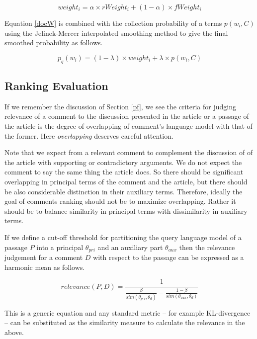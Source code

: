 \documentclass[article]{IEEEtran}
\begin{document}
\begin{equation}
\label{docW}
weight_i = \alpha \times rWeight_i + (1 - \alpha) \times fWeight_i
\end{equation}

Equation \ref{docW} is combined with the collection probability of a terms $p(w_i, C)$ using the Jelinek-Mercer interpolated smoothing method \cite{1371580} to give the final smoothed probability as follows.   

\begin{equation}
\label{wProb}
p_q(w_i) = (1 - \lambda) \times weight_i + \lambda \times p(w_i, C) 
\end{equation}

\subsection{Ranking Evaluation}
If we remember the discussion of Section \ref{pf}, we see the criteria for judging relevance of a comment to the discussion presented in the article or a passage of the article is the degree of overlapping of comment's language model with that of the former. Here \textit{overlapping} deserves careful attention.

Note that we expect from a relevant comment to complement the discussion of of the article with supporting or contradictory arguments. We do not expect the comment to say the same thing the article does. So there should be significant overlapping in principal terms of the comment and the article, but there should be also considerable distinction in their auxiliary terms. Therefore, ideally the goal of comments ranking should not be to maximize overlapping. Rather it should be to balance similarity in principal terms with dissimilarity in auxiliary terms.

If we define a cut-off threshold for partitioning the query language model of a passage $P$ into a principal $\theta_{pri}$ and an auxiliary part $\theta_{aux}$ then the relevance judgement for a comment $D$ with respect to the passage can be expressed as a harmonic mean as follows.

\begin{equation}
\label{relMes}
relevance(P,D) = \frac{1}{\frac{\beta}{sim(\theta_{pri}, \theta_d)} - \frac{1 - \beta}{sim(\theta_{aux}, \theta_d)}}
\end{equation}           

This is a generic equation and any standard metric -- for example KL-divergence -- can be substituted as the similarity measure to calculate the relevance in the above.
\end{document}
